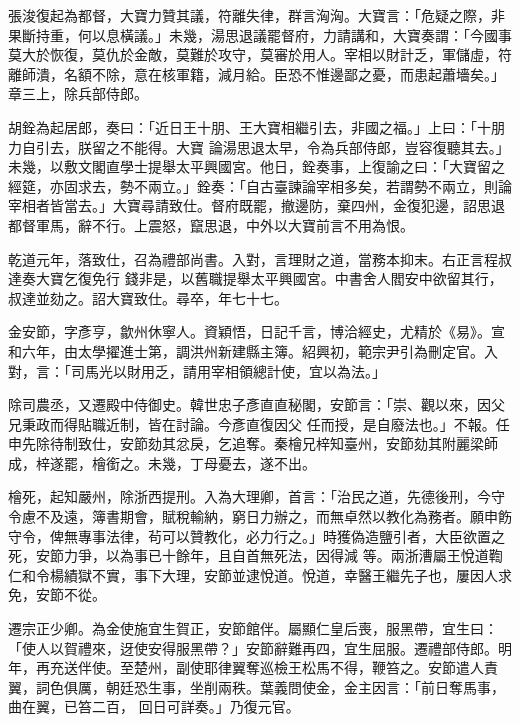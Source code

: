 \begin{pinyinscope}
 張浚復起為都督，大寶力贊其議，符離失律，群言洶洶。大寶言：「危疑之際，非果斷持重，何以息橫議。」未幾，湯思退議罷督府，力請講和，大寶奏謂：「今國事莫大於恢復，莫仇於金敵，莫難於攻守，莫審於用人。宰相以財計乏，軍儲虛，符離師潰，名額不除，意在核軍籍，減月給。臣恐不惟邊鄙之憂，而患起蕭墻矣。」章三上，除兵部侍郎。



 胡銓為起居郎，奏曰：「近日王十朋、王大寶相繼引去，非國之福。」上曰：「十朋力自引去，朕留之不能得。大寶
 論湯思退太早，令為兵部侍郎，豈容復聽其去。」未幾，以敷文閣直學士提舉太平興國宮。他日，銓奏事，上復諭之曰：「大寶留之經筵，亦固求去，勢不兩立。」銓奏：「自古臺諫論宰相多矣，若謂勢不兩立，則論宰相者皆當去。」大寶尋請致仕。督府既罷，撤邊防，棄四州，金復犯邊，詔思退都督軍馬，辭不行。上震怒，竄思退，中外以大寶前言不用為恨。



 乾道元年，落致仕，召為禮部尚書。入對，言理財之道，當務本抑末。右正言程叔達奏大寶乞復免行
 錢非是，以舊職提舉太平興國宮。中書舍人閻安中欲留其行，叔達並劾之。詔大寶致仕。尋卒，年七十七。



 金安節，字彥亨，歙州休寧人。資穎悟，日記千言，博洽經史，尤精於《易》。宣和六年，由太學擢進士第，調洪州新建縣主簿。紹興初，範宗尹引為刪定官。入對，言：「司馬光以財用乏，請用宰相領總計使，宜以為法。」



 除司農丞，又遷殿中侍御史。韓世忠子彥直直秘閣，安節言：「崇、觀以來，因父兄秉政而得貼職近制，皆在討論。今彥直復因父
 任而授，是自廢法也。」不報。任申先除待制致仕，安節劾其忿戾，乞追奪。秦檜兄梓知臺州，安節劾其附麗梁師成，梓遂罷，檜銜之。未幾，丁母憂去，遂不出。



 檜死，起知嚴州，除浙西提刑。入為大理卿，首言：「治民之道，先德後刑，今守令慮不及遠，簿書期會，賦稅輸納，窮日力辦之，而無卓然以教化為務者。願申飭守令，俾無專事法律，茍可以贊教化，必力行之。」時獲偽造鹽引者，大臣欲置之死，安節力爭，以為事已十餘年，且自首無死法，因得減
 等。兩浙漕屬王悅道鞫仁和令楊績獄不實，事下大理，安節並逮悅道。悅道，幸醫王繼先子也，屢因人求免，安節不從。



 遷宗正少卿。為金使施宜生賀正，安節館伴。屬顯仁皇后喪，服黑帶，宜生曰：「使人以賀禮來，迓使安得服黑帶？」安節辭難再四，宜生屈服。遷禮部侍郎。明年，再充送伴使。至楚州，副使耶律翼奪巡檢王松馬不得，鞭笞之。安節遣人責翼，詞色俱厲，朝廷恐生事，坐削兩秩。葉義問使金，金主因言：「前日奪馬事，曲在翼，已笞二百，
 回日可詳奏。」乃復元官。




\end{pinyinscope}
